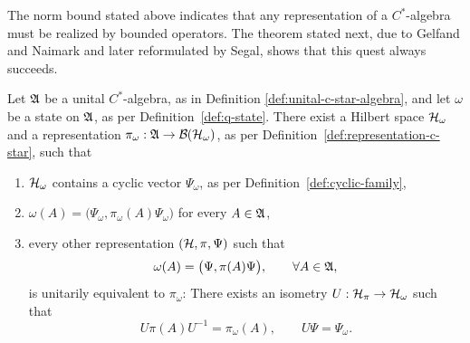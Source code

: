 %	
%
The norm bound stated above indicates that any representation of a $C^*$-algebra must be realized by bounded operators. The theorem stated next, due to Gelfand and Naimark and later reformulated by Segal, shows that this quest always succeeds. 

\begin{theorem}
	\label{thm:gns}
	Let $\mathfrak{A}$ be a unital $C^*$-algebra, as in Definition \ref{def:unital-c-star-algebra}, and let $\omega$ be a state on $\mathfrak{A}$, as per Definition~\ref{def:q-state}. There exist a Hilbert space $\H_\omega$ and a representation $\pi_\omega : \A \to \mathcal{B}(\H_\omega)$, as per Definition~\ref{def:representation-c-star}, such that
	\begin{enumerate}
		\item[i)] $\H_\omega$ contains a cyclic vector $\Psi_\omega$, as per Definition~\ref{def:cyclic-family},
		\item[ii)] $\omega(A) = \big(\Psi_\omega, \pi_\omega(A)\Psi_\omega\big)$ for every $A \in \mathfrak{A}$,
		\item[iii)] every other representation $(\H, \pi, \Psi)$ such that
		\begin{equation}
			\label{eq:gns-hypothesis}
			\omega(A) = \big(\Psi, \pi(A)\Psi\big), \qquad \forall A \in \mathfrak{A},
		\end{equation}
		is unitarily equivalent to $\pi_\omega$: There exists an isometry $U : \H_\pi \to \H_\omega$ such that
		\begin{equation}
			\label{eq:gns-unitary-equivalence}
			U\pi(A)U^{-1} = \pi_\omega(A), \qquad U\Psi = \Psi_\omega.
		\end{equation}
	\end{enumerate}
\end{theorem}

